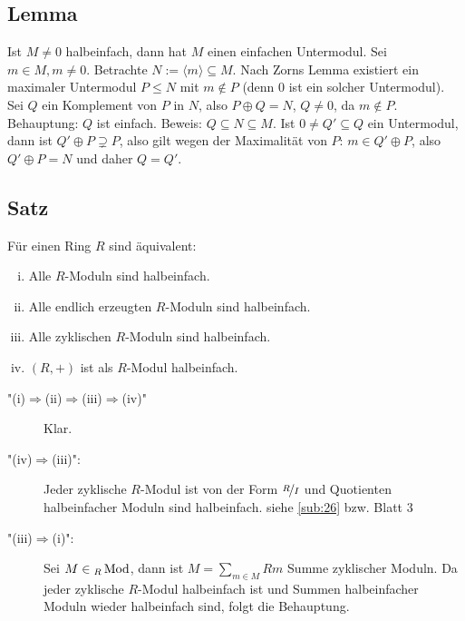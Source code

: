 \subsection[Lemma: Jeder halbeinfache Modul hat einen einfachen Untermodul]{Lemma} %
\label{sub:220}
Ist $M \not= 0$ halbeinfach, dann hat $M$ einen einfachen Untermodul.
Sei $m \in M, m \not= 0$. Betrachte $N := \langle m \rangle \subseteq M$. Nach Zorns Lemma existiert ein maximaler Untermodul $P \le N$ mit $m \not\in P$ (denn $0$ 
ist ein solcher Untermodul). Sei $Q$ ein Komplement von $P$ in $N$, also $P \oplus Q = N$, $Q \not= 0$, da $m \not\in P$. \\
Behauptung: $Q$ ist einfach.  Beweis: $Q \subseteq N \subseteq M$. Ist $0 \not= Q' \subseteq Q$ ein Untermodul, dann ist $Q' \oplus P  \supsetneq P$, also gilt wegen der
Maximalität von $P$: $m \in Q' \oplus P$,
also $Q' \oplus P = N$ und daher $Q=Q'$. \bewende

\subsection[Satz: Alle $R$-Moduln halbeinfach $\Leftrightarrow$ $(R,+)$ halbeinfach]{Satz} %
\label{sub:221}
Für einen Ring $R$ sind äquivalent:
\begin{enumerate}[(i)]
	\item Alle $R$-Moduln sind halbeinfach.
	\item Alle endlich erzeugten $R$-Moduln sind halbeinfach.
	\item Alle zyklischen $R$-Moduln sind halbeinfach.
	\item $(R,+)$ ist als $R$-Modul halbeinfach.
\end{enumerate}
\begin{description}
	\item["(i)$\Rightarrow$(ii)$\Rightarrow$(iii)$\Rightarrow$(iv)"] Klar.
	\item["(iv)$\Rightarrow $(iii)":] Jeder zyklische $R$-Modul ist von der Form $\nicefrac{R}{I}$ und Quotienten halbeinfacher Moduln sind halbeinfach. \hfill 
	{\color{light_gray} siehe \ref{sub:26} bzw. Blatt 3}
	\item["(iii)$\Rightarrow$(i)":] Sei $M \in {_R \operatorname{Mod}}$, dann ist $M = \sum_{m \in M} R m$ Summe zyklischer Moduln. Da jeder zyklische $R$-Modul halbeinfach ist
	und Summen halbeinfacher Moduln wieder halbeinfach sind, folgt die Behauptung. \bewende
\end{description}

